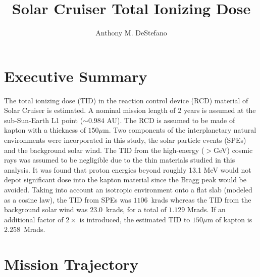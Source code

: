 \documentclass{hitec}
\title{Solar Cruiser Total Ionizing Dose}
\author{Anthony M. DeStefano}
\begin{document}
\maketitle
{}

\tableofcontents
\listoffigures
\listoftables
\lstlistoflistings
\newpage






\cleardoublepage
{}
\section{Executive Summary}

The total ionizing dose (TID) in the reaction control device (RCD) material of Solar Cruiser is estimated. A nominal mission length of 2 years is assumed at the sub-Sun-Earth L1 point ($\sim 0.984$ AU). The RCD is assumed to be made of kapton with a thickness of $150\mu$m. Two components of the interplanetary natural environments were incorporated in this study, the solar particle events (SPEs) and the background solar wind. The TID from the high-energy ($>$GeV) cosmic rays was assumed to be negligible due to the thin materials studied in this analysis. It was found that proton energies beyond roughly 13.1 MeV would not depot significant dose into the kapton material since the Bragg peak would be avoided. Taking into account an isotropic environment onto a flat slab (modeled as a cosine law), the TID from SPEs was $1106$~krads whereas the TID from the background solar wind was $23.0$~krads, for a total of $1.129$ Mrads. If an additional factor of $2\times$ is introduced, the estimated TID to $150\mu$m of kapton is $2.258$~Mrads.



\newpage
\section{Mission Trajectory}
\end{document}
